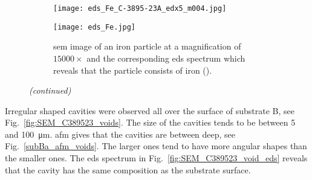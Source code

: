 %
\begin{figure}[htbp]
\ContinuedFloat
    \centering
    \begin{subfigure}[t]{\textwidth}
          \begin{minipage}[t]{0.49\linewidth}
            \centering
            \texttt{[image: eds\_Fe\_C-3895-23A\_edx5\_m004.jpg]}
          \end{minipage}
          \hfill
          \begin{minipage}[t]{0.49\linewidth}
            \centering
            \texttt{[image: eds\_Fe.jpg]}
          \end{minipage}
    \caption{\Ac{sem} image of an iron particle at a magnification of $15000\times$ and the corresponding \ac{eds} spectrum which reveals that the particle consists of iron ().}\label{fig:subBa_partice_Fe}
    \end{subfigure}%
    \captionsetup{list=no}
    \caption{\emph{(continued)}}
\end{figure}

Irregular shaped cavities were observed all over the surface of substrate B, see Fig.~\ref{fig:SEM_C389523_voids}. The size of the cavities tends to be between \SI{5}{} and \SI{100}{\micro\metre}. \Ac{afm} gives that the cavities are between  deep, see Fig.~\ref{subBa_afm_voids}. The larger ones tend to have more angular shapes than the smaller ones. The \ac{eds} spectrum in Fig.~\ref{fig:SEM_C389523_void_eds} reveals that the cavity has the same composition as the substrate surface.


